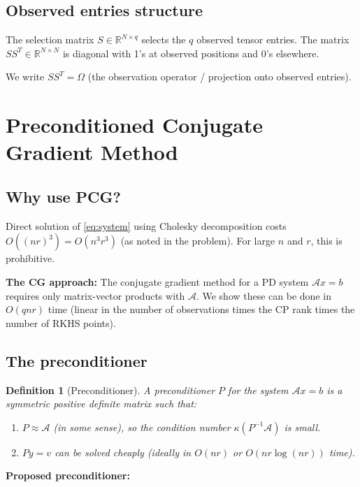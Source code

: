 \documentclass[12pt]{article}
\newtheorem{definition}[theorem]{Definition}
\begin{document}
\subsection{Observed entries structure}

The selection matrix $S \in \mathbb{R}^{N \times q}$ selects the $q$ observed tensor entries. The matrix $SS^T \in \mathbb{R}^{N \times N}$ is diagonal with 1's at observed positions and 0's elsewhere.

We write $SS^T = \Omega$ (the observation operator / projection onto observed entries).

\section{Preconditioned Conjugate Gradient Method}

\subsection{Why use PCG?}

Direct solution of \eqref{eq:system} using Cholesky decomposition costs $O((nr)^3) = O(n^3 r^3)$ (as noted in the problem). For large $n$ and $r$, this is prohibitive.

\textbf{The CG approach:} The conjugate gradient method for a PD system $\mathcal{A}x = b$ requires only matrix-vector products with $\mathcal{A}$. We show these can be done in $O(qnr)$ time (linear in the number of observations times the CP rank times the number of RKHS points).

\subsection{The preconditioner}

\begin{definition}[Preconditioner]\label{def:preconditioner}
A preconditioner $P$ for the system $\mathcal{A}x = b$ is a symmetric positive definite matrix such that:
\begin{enumerate}
\item $P \approx \mathcal{A}$ (in some sense), so the condition number $\kappa(P^{-1}\mathcal{A})$ is small.
\item $Py = v$ can be solved cheaply (ideally in $O(nr)$ or $O(nr \log(nr))$ time).
\end{enumerate}
\end{definition}

\textbf{Proposed preconditioner:}
\end{document}
